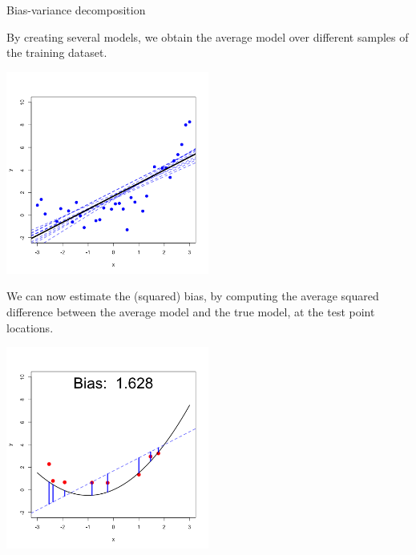 \documentclass[11pt,compress,t,notes=noshow, xcolor=table]{beamer}
\begin{document}
\begin{vbframe} {Bias-variance decomposition}
\framebreak

By creating several models, we obtain the average model over different samples of the training dataset.

\begin{center}
  \includegraphics[width = 0.5\textwidth]{figure/bias_variance_decomposition-linear_model.png}
\end{center}

\framebreak

We can now estimate the (squared) bias, by computing the average squared difference between the average model and the true model, at the test point locations.

\begin{center}
  \includegraphics[width = 0.5\textwidth]{figure/bias_variance_decomposition-linear_model_bias.png}
\end{center}

\framebreak


\end{vbframe}
\end{document}

